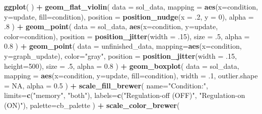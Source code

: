 \documentclass[]{book}
\newenvironment{Shaded}{\begin{snugshade}}{\end{snugshade}}
\newcommand{\DataTypeTok}[1]{\textcolor[rgb]{0.13,0.29,0.53}{#1}}
\newcommand{\DecValTok}[1]{\textcolor[rgb]{0.00,0.00,0.81}{#1}}
\newcommand{\FloatTok}[1]{\textcolor[rgb]{0.00,0.00,0.81}{#1}}
\newcommand{\KeywordTok}[1]{\textcolor[rgb]{0.13,0.29,0.53}{\textbf{#1}}}
\newcommand{\NormalTok}[1]{#1}
\newcommand{\OperatorTok}[1]{\textcolor[rgb]{0.81,0.36,0.00}{\textbf{#1}}}
\newcommand{\OtherTok}[1]{\textcolor[rgb]{0.56,0.35,0.01}{#1}}
\newcommand{\StringTok}[1]{\textcolor[rgb]{0.31,0.60,0.02}{#1}}
\begin{document}
\begin{Shaded}
\begin{Highlighting}[]
\KeywordTok{ggplot}\NormalTok{( ) }\OperatorTok{+}
\StringTok{  }\KeywordTok{geom_flat_violin}\NormalTok{(}
    \DataTypeTok{data =}\NormalTok{ sol_data,}
    \DataTypeTok{mapping =} \KeywordTok{aes}\NormalTok{(}\DataTypeTok{x=}\NormalTok{condition, }\DataTypeTok{y=}\NormalTok{update, }\DataTypeTok{fill=}\NormalTok{condition),}
    \DataTypeTok{position =} \KeywordTok{position_nudge}\NormalTok{(}\DataTypeTok{x =} \FloatTok{.2}\NormalTok{, }\DataTypeTok{y =} \DecValTok{0}\NormalTok{),}
    \DataTypeTok{alpha =} \FloatTok{.8}
\NormalTok{  ) }\OperatorTok{+}
\StringTok{  }\KeywordTok{geom_point}\NormalTok{(}
    \DataTypeTok{data =}\NormalTok{ sol_data,}
    \KeywordTok{aes}\NormalTok{(}\DataTypeTok{x=}\NormalTok{condition, }\DataTypeTok{y=}\NormalTok{update, }\DataTypeTok{color=}\NormalTok{condition),}
    \DataTypeTok{position =} \KeywordTok{position_jitter}\NormalTok{(}\DataTypeTok{width =} \FloatTok{.15}\NormalTok{),}
    \DataTypeTok{size =} \FloatTok{.5}\NormalTok{,}
    \DataTypeTok{alpha =} \FloatTok{0.8}
\NormalTok{  ) }\OperatorTok{+}
\StringTok{  }\KeywordTok{geom_point}\NormalTok{(}
    \DataTypeTok{data =}\NormalTok{ unfinished_data,}
    \DataTypeTok{mapping=}\KeywordTok{aes}\NormalTok{(}\DataTypeTok{x=}\NormalTok{condition, }\DataTypeTok{y=}\NormalTok{graph_update),}
    \DataTypeTok{color=}\StringTok{"gray"}\NormalTok{,}
    \DataTypeTok{position =} \KeywordTok{position_jitter}\NormalTok{(}\DataTypeTok{width =} \FloatTok{.15}\NormalTok{, }\DataTypeTok{height=}\DecValTok{500}\NormalTok{),}
    \DataTypeTok{size =} \FloatTok{.5}\NormalTok{,}
    \DataTypeTok{alpha =} \FloatTok{0.8}
\NormalTok{  ) }\OperatorTok{+}
\StringTok{  }\KeywordTok{geom_boxplot}\NormalTok{(}
    \DataTypeTok{data =}\NormalTok{ sol_data,}
    \DataTypeTok{mapping =} \KeywordTok{aes}\NormalTok{(}\DataTypeTok{x=}\NormalTok{condition, }\DataTypeTok{y=}\NormalTok{update, }\DataTypeTok{fill=}\NormalTok{condition),}
    \DataTypeTok{width =} \FloatTok{.1}\NormalTok{,}
    \DataTypeTok{outlier.shape =} \OtherTok{NA}\NormalTok{,}
    \DataTypeTok{alpha =} \FloatTok{0.5}
\NormalTok{  ) }\OperatorTok{+}
\StringTok{  }\KeywordTok{scale_fill_brewer}\NormalTok{(}
    \DataTypeTok{name=}\StringTok{"Condition:"}\NormalTok{,}
    \DataTypeTok{limits=}\KeywordTok{c}\NormalTok{(}\StringTok{"memory"}\NormalTok{, }\StringTok{"both"}\NormalTok{),}
    \DataTypeTok{labels=}\KeywordTok{c}\NormalTok{(}\StringTok{"Regulation-off (OFF)"}\NormalTok{, }\StringTok{"Regulation-on (ON)"}\NormalTok{),}
    \DataTypeTok{palette=}\NormalTok{cb_palette}
\NormalTok{  ) }\OperatorTok{+}
\StringTok{  }\KeywordTok{scale_color_brewer}\NormalTok{(}

\end{Highlighting}
\end{Shaded}
\end{document}
